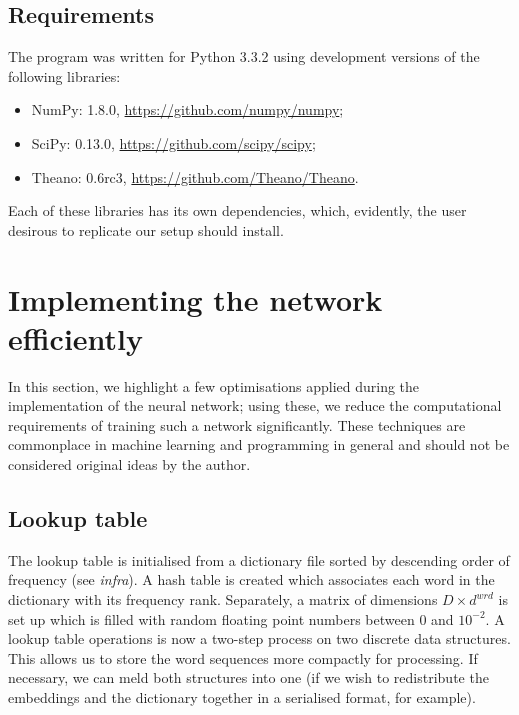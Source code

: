 \subsection{Requirements}
\label{sec:requirements}

The program was written for Python 3.3.2 using development versions of
the following libraries:

\begin{itemize}
\item NumPy: 1.8.0, \url{https://github.com/numpy/numpy};
\item SciPy: 0.13.0, \url{https://github.com/scipy/scipy};
\item Theano: 0.6rc3, \url{https://github.com/Theano/Theano}.
\end{itemize}

Each of these libraries has its own dependencies, which, evidently,
the user desirous to replicate our setup should install.

\section{Implementing the network efficiently}
\label{sec:implementation}

In this section, we highlight a few optimisations applied during the
implementation of the neural network; using these, we reduce the
computational requirements of training such a network
significantly. These techniques are commonplace in machine learning
and programming in general and should not be considered original ideas
by the author.

\subsection{Lookup table}
\label{sec:ltable}
The lookup table is initialised from a dictionary file sorted by
descending order of frequency (see \textit{infra}). A hash table is
created which associates each word in the dictionary with its
frequency rank. Separately, a matrix of dimensions $D \times d^{wrd}$
is set up which is filled with random floating point numbers between
$0$ and $10^{-2}$. A lookup table operations is now a two-step process
on two discrete data structures. This allows us to store the word
sequences more compactly for processing. If necessary, we can meld
both structures into one (if we wish to redistribute the embeddings
and the dictionary together in a serialised format, for example).

